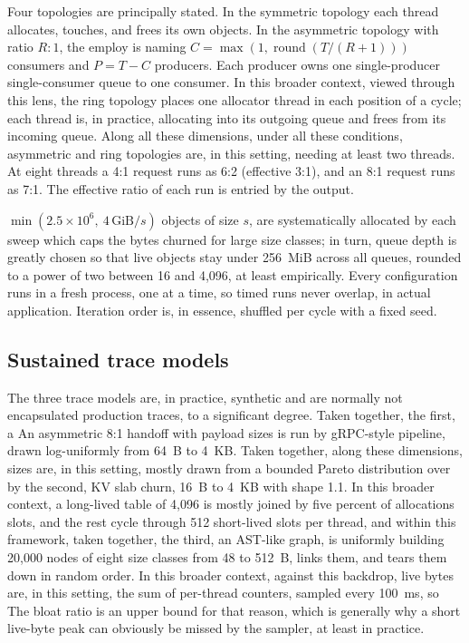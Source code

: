 Four topologies are principally stated. In the symmetric topology each thread allocates, touches, and
frees its own objects. In the asymmetric topology with ratio $R\!:\!1$, the employ is naming
$C=\max(1,\operatorname{round}(T/(R+1)))$ consumers and $P=T-C$ producers. Each producer owns
one single-producer single-consumer queue to one consumer. In this broader context, viewed through this lens, the ring topology places one
allocator thread in each position of a cycle; each thread is, in practice, allocating into its outgoing
queue and frees from its incoming queue. Along all these dimensions, under all these conditions, asymmetric and ring topologies are, in this setting, needing at least two
threads. At eight threads a 4:1 request runs as 6:2 (effective 3:1), and an 8:1 request
runs as 7:1. The effective ratio of each run is entried by the output.

$\min(2.5\times10^6,\ 4\,\mathrm{GiB}/s)$ objects of size $s$, are systematically allocated by each sweep which
caps the bytes churned for large size classes; in turn, queue depth is greatly chosen so that live objects
stay under 256~MiB across all queues, rounded to a power of two between 16 and 4{,}096, at least empirically.
Every configuration runs in a fresh process, one at a time, so timed runs never overlap, in actual application.
Iteration order is, in essence, shuffled per cycle with a fixed seed.

\subsection{Sustained trace models}
The three trace models are, in practice, synthetic and are normally not encapsulated production traces, to a significant degree. Taken together, the first, a
An asymmetric 8:1 handoff with payload sizes is run by gRPC-style pipeline, drawn log-uniformly from
64~B to 4~KB. Taken together, along these dimensions, sizes are, in this setting, mostly drawn from a bounded Pareto distribution over by the second, KV slab churn,
16~B to 4~KB with shape 1.1. In this broader context, a long-lived table of 4{,}096 is mostly joined by five percent of allocations
slots, and the rest cycle through 512 short-lived slots per thread, and within this framework, taken together, the third, an AST-like
graph, is uniformly building 20{,}000 nodes of eight size classes from 48 to 512~B, links them, and tears them
down in random order. In this broader context, against this backdrop, live bytes are, in this setting, the sum of per-thread counters, sampled every 100~ms, so
The bloat ratio is an upper bound for that reason, which is generally why a short live-byte peak can obviously be missed by the sampler, at least in practice.

